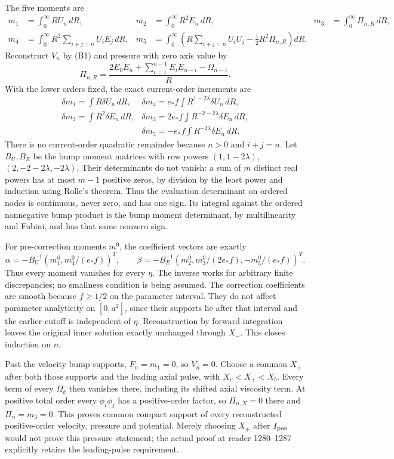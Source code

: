 \documentclass[10pt,a4paper]{article}
\begin{document}
The five moments are \[
\begin{aligned}
m_1&=\int_0^\infty RU_n\,dR,&m_2&=\int_0^\infty R^2E_n\,dR,&m_3&=\int_0^\infty\Pi_{n,R}\,dR,\\
m_4&=\int_0^\infty R^2\sum_{i+j=n}U_iE_j\,dR,&
m_5&=\int_0^\infty\left(R\sum_{i+j=n}U_iU_j-\tfrac12R^2\Pi_{n,R}\right)dR.
\end{aligned}
\] Reconstruct \(V_n\) by (B1) and pressure with zero axis value by \[
\Pi_{n,R}=\frac{2E_0E_n+\sum_{i=1}^{n-1}E_iE_{n-i}-\Omega_{n-1}}{R}.
\] With the lower orders fixed, the exact current-order increments are \[
\begin{array}{ll}
\delta m_1=\int R\delta U_n\,dR,&
\delta m_4=e_*f\int R^{1-2\lambda}\delta U_n\,dR,\\
\delta m_2=\int R^2\delta E_n\,dR,&
\delta m_3=2e_*f\int R^{-2-2\lambda}\delta E_n\,dR,\\
&\delta m_5=-e_*f\int R^{-2\lambda}\delta E_n\,dR.
\end{array}
\tag{B5}
\] There is no current-order quadratic remainder because \(n>0\) and \(i+j=n\). Let \(B_U,B_E\) be the bump moment matrices with row powers \((1,1-2\lambda)\), \((2,-2-2\lambda,-2\lambda)\). Their determinants do not vanish: a sum of \(m\) distinct real powers has at most \(m-1\) positive zeros, by division by the least power and induction using Rolle's theorem. Thus the evaluation determinant on ordered nodes is continuous, never zero, and has one sign. Its integral against the ordered nonnegative bump product is the bump moment determinant, by multilinearity and Fubini, and has that same nonzero sign.

For pre-correction moments \(m^0\), the coefficient vectors are exactly \[
\alpha=-B_U^{-1}(m_1^0,m_4^0/(e_*f))^T,
\qquad
\beta=-B_E^{-1}(m_2^0,m_3^0/(2e_*f),-m_5^0/(e_*f))^T.
\tag{B6}
\] Thus every moment vanishes for every \(\eta\). The inverse works for arbitrary finite discrepancies; no smallness condition is being assumed. The correction coefficients are smooth because \(f\ge1/2\) on the parameter interval. They do not affect parameter analyticity on \([0,a^2]\), since their supports lie after that interval and the earlier cutoff is independent of \(\eta\). Reconstruction by forward integration leaves the original inner solution exactly unchanged through \(X_-\). This closes induction on \(n\).

Past the velocity bump supports, \(F_n=m_1=0\), so \(V_n=0\). Choose a common \(X_+\) after both those supports and the leading axial pulse, with \(X_v<X_+<X_b\). Every term of every \(\Omega_k\) then vanishes there, including its shifted axial viscosity term. At positive total order every \(\phi_i\phi_j\) has a positive-order factor, so \(\Pi_{n,X}=0\) there and \(\Pi_n=m_3=0\). This proves common compact support of every reconstructed positive-order velocity, pressure and potential. Merely choosing \(X_+\) after \(I_{\rm pos}\) would not prove this pressure statement; the actual proof at reader 1280--1287 explicitly retains the leading-pulse requirement.
\end{document}
